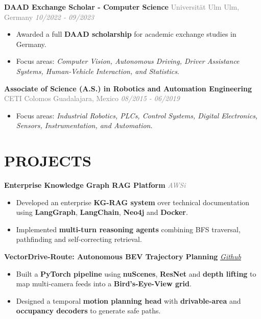 \documentclass[a4paper]{article}
\newcommand{\entrytitle}[1]{{\fontsize{12pt}{13.2pt}\selectfont\textbf{#1}}}
\begin{document}
\vspace{0.1cm}
\entrytitle{DAAD Exchange Scholar - Computer Science} {\small \textcolor{graytext}{Universität Ulm} \hfill \textcolor{graytext}{Ulm, Germany \quad \textit{10/2022 - 09/2023}}}
\begin{itemize}
  \item Awarded a full \textbf{DAAD scholarship} for academic exchange studies in Germany.
  \item Focus areas: \textit{Computer Vision, Autonomous Driving, Driver Assistance Systems, Human-Vehicle Interaction, and Statistics}.
\end{itemize}

\vspace{0.1cm}
\entrytitle{Associate of Science (A.S.) in Robotics and Automation Engineering} {\small \textcolor{graytext}{CETI Colomos} \hfill \textcolor{graytext}{Guadalajara, Mexico \quad \textit{08/2015 - 06/2019}}}
\begin{itemize}
  \item Focus areas: \textit{Industrial Robotics, PLCs, Control Systems, Digital Electronics, Sensors, Instrumentation, and Automation}.
\end{itemize}

\section*{PROJECTS}

\entrytitle{Enterprise Knowledge Graph RAG Platform} \hfill {\small \textcolor{graytext}{\textit{AWSi}}}
\begin{itemize}
  \item Developed an enterprise \textbf{KG-RAG system} over technical documentation using \textbf{LangGraph}, \textbf{LangChain}, \textbf{Neo4j} and \textbf{Docker}.
  \item Implemented \textbf{multi-turn reasoning agents} combining BFS traversal, pathfinding and self-correcting retrieval.
\end{itemize}

\entrytitle{VectorDrive-Route: Autonomous BEV Trajectory Planning} \hfill {\small \textcolor{graytext}{\textit{\href{https://github.com/LaloVene/vectordrive-route}{Github}}}}
\begin{itemize}
  \item Built a \textbf{PyTorch pipeline} using \textbf{nuScenes}, \textbf{ResNet} and \textbf{depth lifting} to map multi-camera feeds into a \textbf{Bird’s-Eye-View grid}.
  \item Designed a temporal \textbf{motion planning head} with \textbf{drivable-area} and \textbf{occupancy decoders} to generate safe paths.
\end{itemize}
\end{document}
